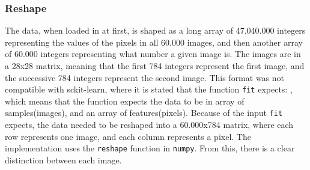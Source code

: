 \subsubsection{Reshape}\label{subsec:preprocessing-reshape}
The data, when loaded in at first, is shaped as a long array of 47.040.000 integers representing the values of the pixels in all 60.000 images, and then another array of 60.000 integers representing what number a given image is. The images are in a 28x28 matrix, meaning that the first 784 integers represent the first image, and the successive 784 integers represent the second image. This format was not compatible with \gls{sckit-learn}, where it is stated that the function \texttt{fit} expects: , which means that the function expects the data to be in array of samples(images), and an array of features(pixels). Because of the input \texttt{fit} expects, the data needed to be reshaped into a 60.000x784 matrix, where each row represents one image, and each column represents a pixel. The implementation uses the \texttt{reshape} function in \texttt{numpy}. From this, there is a clear distinction between each image.
  